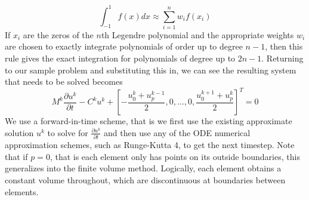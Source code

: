 \documentclass[openany]{book}
\newcommand{\p}[2]{\frac{\partial#1}{\partial#2}}
\begin{document}
$$ \int^1_{-1} f(x) dx \approx \sum^n_{i=1} w_if(x_i)$$
If $x_i$ are the zeros of the $n$th Legendre polynomial and the appropriate weights $w_i$ are chosen to exactly integrate polynomials of order up to degree $n-1$, then this rule gives the exact integration for polynomials of degree up to $2n-1$. Returning to our sample problem and substituting this in, we can see the resulting system that needs to be solved becomes
$$ M^k \p{u^k}{t} - C^k u^k + \left[- \frac{u_0^k + u_p^{k-1}}{2},0,\dots , 0, \frac{u_0^{k+1} + u_p^k}{2}\right]^T = 0$$
We use a forward-in-time scheme, that is we first use the existing approximate solution $u^k$ to solve for $\p{u^k}{t}$ and then use any of the ODE numerical approximation schemes, such as Runge-Kutta 4, to get the next timestep. Note that if $p=0$, that is each element only has points on its outside boundaries, this generalizes into the finite volume method. Logically, each element obtains a constant volume throughout, which are discontinuous at boundaries between elements.
\end{document}
